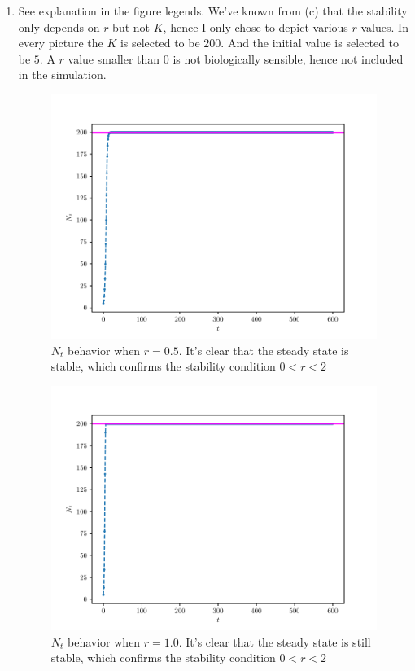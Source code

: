 \begin{homeworkProblem}[4]
\begin{enumerate}
\pagebreak
\item See explanation in the figure legends. We've known from (c) that the
stability only depends on $r$ but not $K$, hence I only chose to depict various
$r$ values. In every picture the $K$ is selected to be $200$. And the initial
value is selected to be $5$. A $r$ value smaller than $0$ is not biologically
sensible, hence not
included in the simulation.
\begin{figure}
    \centering
    \caption{$N_t$ behavior when $r = 0.5$. It's clear that the steady state is
    stable, which confirms the stability condition $0 < r < 2$}
    \includegraphics[scale=0.6]{fig/fig4(d)(1).pdf}
\end{figure}
\begin{figure}
    \centering
    \caption{$N_t$ behavior when $r = 1.0$. It's clear that the steady state is
    still stable, which confirms the stability condition $0 < r < 2$}
    \includegraphics[scale=0.6]{fig/fig4(d)(2).pdf}

\end{figure}
\end{enumerate}
\end{homeworkProblem}
